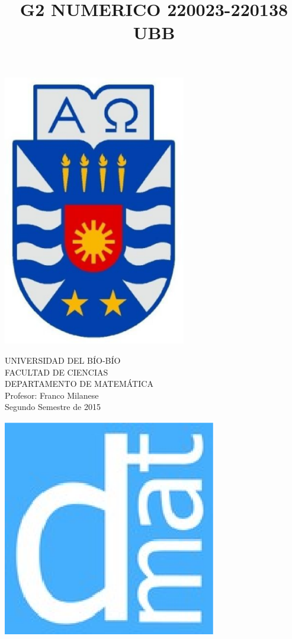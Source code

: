\documentclass[11pt]{article}
\begin{document}
\title{G2 NUMERICO 220023-220138 UBB}

{\begin{minipage}{2cm}
\hspace*{1cm}\includegraphics[width=0.6\textwidth]{escubo-ubb.eps}
\end{minipage}
\begin{minipage}{12cm}
\small
{\bf \rm 
{
\begin{center}
{\footnotesize UNIVERSIDAD DEL B\'IO-B\'IO} \\
{\scriptsize FACULTAD DE CIENCIAS}  \\
{\scriptsize DEPARTAMENTO DE MATEM\'ATICA}  \\
{\scriptsize Profesor:  Franco Milanese}\\
{\scriptsize Segundo Semestre de 2015}
\end{center}
}}
\end{minipage}}
{\begin{minipage}{2cm}
\hspace*{-0.5cm}\vspace*{-0.05cm}\includegraphics[width=0.7\textwidth]{escudo-dmat.eps}
\end{minipage}}
\end{document}

